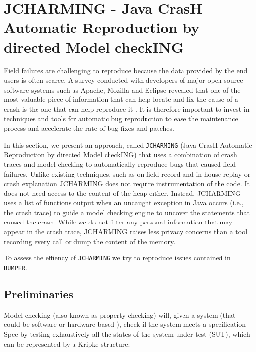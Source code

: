 
\section{JCHARMING - Java CrasH Automatic Reproduction by directed Model checkING\label{sec:JCHARMING}}

Field failures are challenging to reproduce because
the data provided by the end users is often scarce. A survey
conducted with developers of major open source software
systems such as Apache, Mozilla and Eclipse revealed that
one of the most valuable piece of information that can help
locate and fix the cause of a crash is the one that can help
reproduce it \cite{Bettenburg2008}. It is therefore important to invest in
techniques and tools for automatic bug reproduction to ease
the maintenance process and accelerate the rate of bug fixes
and patches.

In this section, we present an approach, called {\tt JCHARMING}
(Java CrasH Automatic Reproduction by directed Model
checkING) that uses a combination of crash traces and model
checking to automatically reproduce bugs that caused field
failures. Unlike existing techniques, such as on-field record and in-house replay \cite{Narayanasamy2005,Artzi2008,Jaygarl} or crash explanation \cite{Manevich2004,chandra2009snugglebug} JCHARMING does not
require instrumentation of the code. It does not need access to
the content of the heap either. Instead, JCHARMING uses a
list of functions output when an uncaught exception in Java
occurs (i.e., the crash trace) to guide a model checking engine
to uncover the statements that caused the crash. While we do not filter any personal information that may appear in the crash trace, JCHARMING  raises less privacy concerns than a tool recording every call or dump the content of the memory.

To assess the effiency of {\tt JCHARMING} we try to reproduce issues contained in {\tt BUMPER}.

\subsection{Preliminaries}

Model checking (also known as property checking) will, given a system (that could be software \cite{Visser2003} or hardware based \cite{kropf1999introduction}), check if the system meets a specification Spec by testing exhaustively all the states of the system under test (SUT), which can be represented by a Kripke \cite{Kripke1963} structure:

